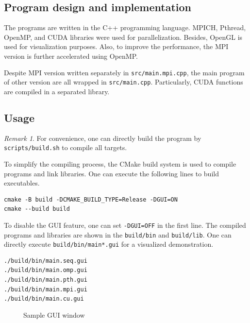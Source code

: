 \documentclass[twoside,12pt]{article}
\theoremstyle{definition}
\theoremstyle{remark}
\newtheorem*{remark}{Remark}
\begin{document}
\subsection{Program design and implementation}
The programs are written in the C++ programming language.
MPICH, Pthread, OpenMP, and CUDA libraries were used for parallelization.
Besides, OpenGL is used for visualization purposes.
Also, to improve the performance, the MPI version is further accelerated
using OpenMP.

Despite MPI version written separately in \lstinline|src/main.mpi.cpp|, 
the main program of other version are all wrapped
in \lstinline|src/main.cpp|.
Particularly, CUDA functions are compiled in a separated library.


\subsection{Usage}
\begin{remark}
For convenience, one can directly build the program by \lstinline|scripts/build.sh|
to compile all targets.
\end{remark}
To simplify the compiling process, the CMake build system is used
to compile programs and link libraries.
One can execute the following lines to build executables.
\begin{lstlisting}[style=sh]
cmake -B build -DCMAKE_BUILD_TYPE=Release -DGUI=ON
cmake --build build
\end{lstlisting}
To disable the GUI feature, one can set \lstinline|-DGUI=OFF| in the first line.
The compiled programs and libraries are shown in the \lstinline|build/bin| and
\lstinline|build/lib|.
One can directly execute \lstinline|build/bin/main*.gui| for a visualized demonstration.
\begin{lstlisting}[style=sh]
./build/bin/main.seq.gui
./build/bin/main.omp.gui
./build/bin/main.pth.gui
./build/bin/main.mpi.gui
./build/bin/main.cu.gui
\end{lstlisting}

\begin{figure}[h!]
    \centering
    \caption{Sample GUI window}
    \label{fig:image}
\end{figure}
\end{document}
